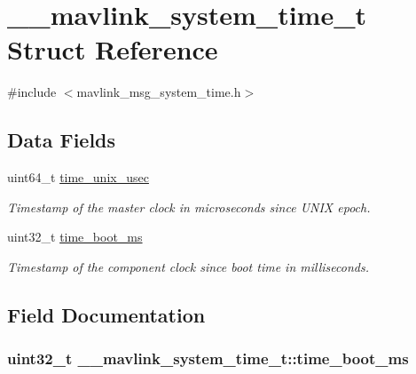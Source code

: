 \hypertarget{struct____mavlink__system__time__t}{\section{\+\_\+\+\_\+mavlink\+\_\+system\+\_\+time\+\_\+t Struct Reference}
\label{struct____mavlink__system__time__t}
}


{\ttfamily \#include $<$mavlink\+\_\+msg\+\_\+system\+\_\+time.\+h$>$}

\subsection*{Data Fields}
\begin{DoxyCompactItemize}
\item 
uint64\+\_\+t \hyperlink{struct____mavlink__system__time__t_ae546feebc5c1920448812ff0f2432366}{time\+\_\+unix\+\_\+usec}
\begin{DoxyCompactList}\small\item\em Timestamp of the master clock in microseconds since U\+N\+I\+X epoch. \end{DoxyCompactList}\item 
uint32\+\_\+t \hyperlink{struct____mavlink__system__time__t_a262df1d58382c46c44f1612382335c46}{time\+\_\+boot\+\_\+ms}
\begin{DoxyCompactList}\small\item\em Timestamp of the component clock since boot time in milliseconds. \end{DoxyCompactList}\end{DoxyCompactItemize}


\subsection{Field Documentation}
\hypertarget{struct____mavlink__system__time__t_a262df1d58382c46c44f1612382335c46}{
\subsubsection[{time\+\_\+boot\+\_\+ms}]{\setlength{\rightskip}{0pt plus 5cm}uint32\+\_\+t \+\_\+\+\_\+mavlink\+\_\+system\+\_\+time\+\_\+t\+::time\+\_\+boot\+\_\+ms}}\label{struct____mavlink__system__time__t_a262df1d58382c46c44f1612382335c46}


